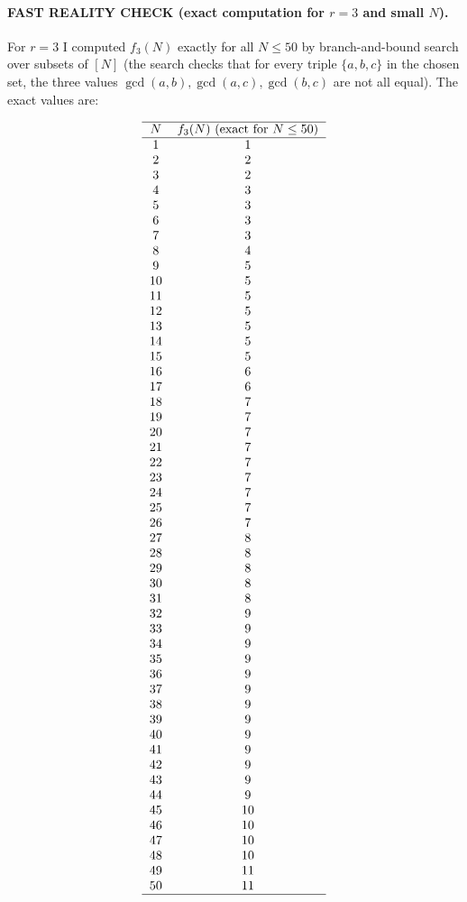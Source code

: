 \paragraph{FAST REALITY CHECK (exact computation for $r=3$ and small $N$).}
For $r=3$ I computed $f_3(N)$ exactly for all $N\le 50$ by branch-and-bound search over subsets of $[N]$ (the search checks that for every triple $\{a,b,c\}$ in the chosen set, the three values $\gcd(a,b),\gcd(a,c),\gcd(b,c)$ are not all equal). The exact values are:

\[
\begin{tabular}{cc}
 \hline
$N$ & $f_3(N)$ (exact for $N\le 50$)\\ \hline
1 & 1\\
2 & 2\\
3 & 2\\
4 & 3\\
5 & 3\\
6 & 3\\
7 & 3\\
8 & 4\\
9 & 5\\
10 & 5\\
11 & 5\\
12 & 5\\
13 & 5\\
14 & 5\\
15 & 5\\
16 & 6\\
17 & 6\\
18 & 7\\
19 & 7\\
20 & 7\\
21 & 7\\
22 & 7\\
23 & 7\\
24 & 7\\
25 & 7\\
26 & 7\\
27 & 8\\
28 & 8\\
29 & 8\\
30 & 8\\
31 & 8\\
32 & 9\\
33 & 9\\
34 & 9\\
35 & 9\\
36 & 9\\
37 & 9\\
38 & 9\\
39 & 9\\
40 & 9\\
41 & 9\\
42 & 9\\
43 & 9\\
44 & 9\\
45 & 10\\
46 & 10\\
47 & 10\\
48 & 10\\
49 & 11\\
50 & 11\\
\hline
\end{tabular}
\]


